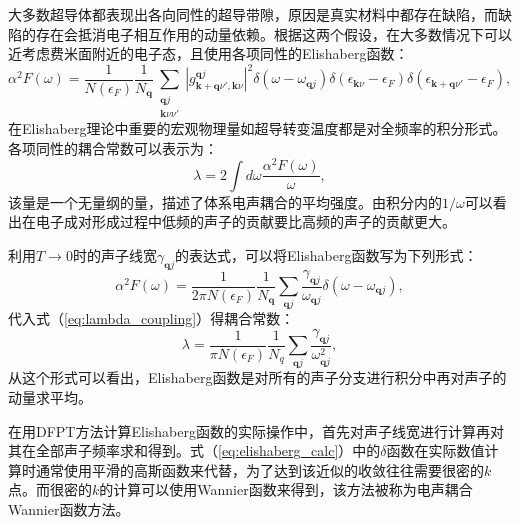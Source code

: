 大多数超导体都表现出各向同性的超导带隙，原因是真实材料中都存在缺陷，而缺陷的存在会抵消电子相互作用的动量依赖。根据这两个假设，在大多数情况下可以近考虑费米面附近的电子态，且使用各项同性的Elishaberg函数：
\begin{equation}\label{eq:elishaberg_iso}
  \alpha^2 F(\omega) = \frac{1}{N(\epsilon_F)}\frac{1}{N_{\bm{q}}}
  \sum_{\substack{\bm{q}j \\ \bm{k}\nu\nu'}} |g^{\bm{q}j}_{\bm{k}+\bm{q}\nu',\bm{k}\nu}|^2
  \delta(\omega-\omega_{\bm{q}j})
  \delta(\epsilon_{\bm{k}\nu}-\epsilon_{F})
  \delta(\epsilon_{\bm{k}+\bm{q}\nu'}-\epsilon_F) ,
\end{equation}
在Elishaberg理论中重要的宏观物理量如超导转变温度都是对全频率的积分形式。各项同性的耦合常数可以表示为：
\begin{equation}\label{eq:lambda_coupling}
  \lambda = 2 \int d\omega \frac{\alpha^2 F(\omega)}{\omega} ,
\end{equation}
该量是一个无量纲的量，描述了体系电声耦合的平均强度。由积分内的$1/\omega$可以看出在电子成对形成过程中低频的声子的贡献要比高频的声子的贡献更大。

利用$T\rightarrow 0$时的声子线宽$\gamma_{\bm{q}j}$的表达式，可以将Elishaberg函数写为下列形式：
\begin{equation}\label{eq:elishaberg_calc}
  \alpha^2 F(\omega) = \frac{1}{2\pi N(\epsilon_F)}\frac{1}{N_{\bm{q}}}
  \sum_{\bm{q}j} \frac{\gamma_{\bm{q}j}}{\omega_{\bm{q}j}}
  \delta(\omega-\omega_{\bm{q}j}) ,
\end{equation}
代入式（\ref{eq:lambda_coupling}）得耦合常数：
\begin{equation}
  \lambda = \frac{1}{\pi N(\epsilon_F)}\frac{1}{N_q}
  \sum_{\bm{q}j}\frac{\gamma_{\bm{q}j}}{\omega^2_{\bm{q}j}} ,
\end{equation}
从这个形式可以看出，Elishaberg函数是对所有的声子分支进行积分中再对声子的动量求平均。

在用DFPT方法计算Elishaberg函数的实际操作中，首先对声子线宽进行计算再对其在全部声子频率求和得到。式（\ref{eq:elishaberg_calc}）中的$\delta$函数在实际数值计算时通常使用平滑的高斯函数来代替，为了达到该近似的收敛往往需要很密的$k$点。而很密的$k$的计算可以使用Wannier函数来得到，该方法被称为电声耦合Wannier函数方法\cite{ponce2016epw}。


